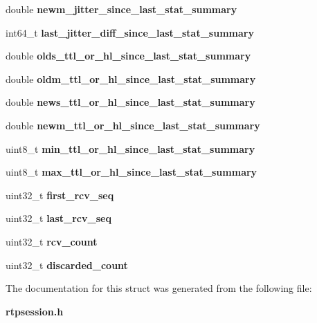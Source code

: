 \begin{DoxyCompactItemize}
double {\bfseries newm\+\_\+jitter\+\_\+since\+\_\+last\+\_\+stat\+\_\+summary}
\item 
\mbox{\label{structOrtpRtcpXrStats_aed07761b1eeca828f2ec9d9f54e78f02}} 
int64\+\_\+t {\bfseries last\+\_\+jitter\+\_\+diff\+\_\+since\+\_\+last\+\_\+stat\+\_\+summary}
\item 
\mbox{\label{structOrtpRtcpXrStats_ab77731310f69ceb46eca4c936a9bcdf8}} 
double {\bfseries olds\+\_\+ttl\+\_\+or\+\_\+hl\+\_\+since\+\_\+last\+\_\+stat\+\_\+summary}
\item 
\mbox{\label{structOrtpRtcpXrStats_ab66620355d18bc7b9e3d25b658686bbc}} 
double {\bfseries oldm\+\_\+ttl\+\_\+or\+\_\+hl\+\_\+since\+\_\+last\+\_\+stat\+\_\+summary}
\item 
\mbox{\label{structOrtpRtcpXrStats_a4a49c760d1782575907da7cc6387cbb7}} 
double {\bfseries news\+\_\+ttl\+\_\+or\+\_\+hl\+\_\+since\+\_\+last\+\_\+stat\+\_\+summary}
\item 
\mbox{\label{structOrtpRtcpXrStats_ae567ec8011e40387ab497e4d7ee8bfd3}} 
double {\bfseries newm\+\_\+ttl\+\_\+or\+\_\+hl\+\_\+since\+\_\+last\+\_\+stat\+\_\+summary}
\item 
\mbox{\label{structOrtpRtcpXrStats_ab7b10e1944a83ce37a4e86b0c9345c6e}} 
uint8\+\_\+t {\bfseries min\+\_\+ttl\+\_\+or\+\_\+hl\+\_\+since\+\_\+last\+\_\+stat\+\_\+summary}
\item 
\mbox{\label{structOrtpRtcpXrStats_a9e63e7a66df8161b3992bc50ac9b28b9}} 
uint8\+\_\+t {\bfseries max\+\_\+ttl\+\_\+or\+\_\+hl\+\_\+since\+\_\+last\+\_\+stat\+\_\+summary}
\item 
\mbox{\label{structOrtpRtcpXrStats_abdcac4ecb56cb25f118440348bc6f391}} 
uint32\+\_\+t {\bfseries first\+\_\+rcv\+\_\+seq}
\item 
\mbox{\label{structOrtpRtcpXrStats_a0486c7ad65ad15099b2aaed45ac70992}} 
uint32\+\_\+t {\bfseries last\+\_\+rcv\+\_\+seq}
\item 
\mbox{\label{structOrtpRtcpXrStats_af999c7f9b8b548a8e8780d390877e319}} 
uint32\+\_\+t {\bfseries rcv\+\_\+count}
\item 
\mbox{\label{structOrtpRtcpXrStats_acc5933a01ee3c070a916f92f0451f269}} 
uint32\+\_\+t {\bfseries discarded\+\_\+count}
\end{DoxyCompactItemize}


The documentation for this struct was generated from the following file\+:\begin{DoxyCompactItemize}
\item 
\textbf{ rtpsession.\+h}\end{DoxyCompactItemize}
